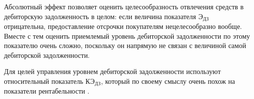  Абсолютный эффект позволяет оценить целесообразность отвлечения средств в дебиторскую задолженность в целом: если величина показателя $\text{Э}_\text{ДЗ}$ отрицательна, предоставление отсрочки покупателям нецелесообразно вообще.
 Вместе с тем оценить приемлемый уровень дебиторской задолженности по этому показателю очень сложно, поскольку он напрямую не связан с величиной самой дебиторской задолженности.
 
 Для целей управления уровнем дебиторской задолженности используют относительный показатель $  \text{КЭ}_\text{ДЗ}$, который по своему смыслу очень похож на показатели рентабельности \cite[229--232]{nezamaikn}.
 
 
 
 
 
 
 
 
 
 
 
 